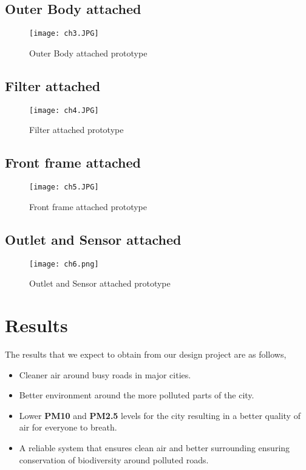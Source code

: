 \documentclass[12pt]{article}
\begin{document}
\subsection{Outer Body attached}
\begin{figure}[!htb]
\centering
\texttt{[image: ch3.JPG]}
\caption{\label{fig:}Outer Body attached prototype}
\end{figure}


\subsection{Filter attached}

\begin{figure}[!htb]
\centering
\texttt{[image: ch4.JPG]}
\caption{\label{fig:}Filter attached prototype}
\end{figure}

\subsection{Front frame attached}

\begin{figure}[!htb]
\centering
\texttt{[image: ch5.JPG]}
\caption{\label{fig:}Front frame attached prototype}
\end{figure}


\subsection{Outlet and Sensor attached}

\begin{figure}[!htb]
\centering
\texttt{[image: ch6.png]}
\caption{\label{fig:}Outlet and Sensor attached prototype}
\end{figure}


\newpage

\section{Results}

The results that we expect to obtain from our design project are as follows, 

\begin{itemize}
\item Cleaner air around busy roads in major cities.
\item Better environment around the more polluted parts of the city.
\item Lower \textbf{PM10} and \textbf{PM2.5} levels for the city resulting in a better quality of air for everyone to breath.
\item A reliable system that ensures clean air and better surrounding ensuring conservation of biodiversity around polluted roads.
\end{itemize}  
\end{document}
